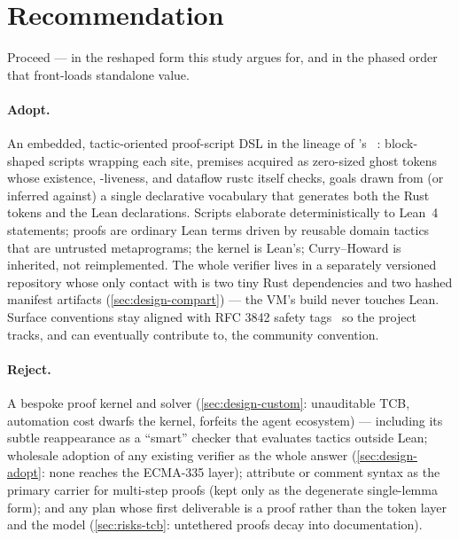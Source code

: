 \section{Recommendation}
\label{sec:recommendation}

Proceed --- in the reshaped form this study argues for, and in the
phased order that front-loads standalone value.

\paragraph{Adopt.} An embedded, tactic-oriented proof-script DSL in
the lineage of 's ~\cite{dotnetdll}:
block-shaped  scripts wrapping each 
site, premises acquired as zero-sized ghost tokens whose existence,
-liveness, and dataflow rustc itself checks, goals drawn
from (or inferred against) a single declarative vocabulary that
generates both the Rust tokens and the Lean declarations. Scripts
elaborate deterministically to Lean~4 statements; proofs are ordinary
Lean terms driven by reusable domain tactics that are untrusted
metaprograms; the kernel is Lean's; Curry--Howard is inherited, not
reimplemented. The whole verifier lives in a separately versioned
repository whose only contact with \dotnetrs{} is two tiny Rust
dependencies and two hashed manifest artifacts
(\cref{sec:design-compart}) --- the VM's build never touches Lean.
Surface conventions stay aligned with RFC 3842 safety
tags~\cite{rfc3842} so the project tracks, and can eventually
contribute to, the community convention.

\paragraph{Reject.} A bespoke proof kernel and solver
(\cref{sec:design-custom}: unauditable TCB, automation cost dwarfs the
kernel, forfeits the agent ecosystem) --- including its subtle
reappearance as a ``smart'' checker that evaluates tactics outside
Lean; wholesale adoption of any existing verifier as the whole answer
(\cref{sec:design-adopt}: none reaches the ECMA-335 layer); attribute
or comment syntax as the primary carrier for multi-step proofs (kept
only as the degenerate single-lemma form); and any plan whose first
deliverable is a proof rather than the token layer and the model
(\cref{sec:risks-tcb}: untethered proofs decay into documentation).

